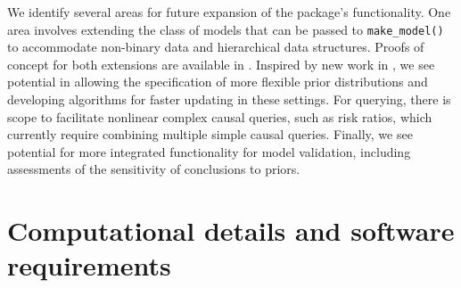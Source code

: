 \documentclass[
  11pt,
  article]{jss}
\begin{document}
We identify several areas for future expansion of the package's
functionality. One area involves extending the class of models that can
be passed to \texttt{make\_model()} to accommodate non-binary data and
hierarchical data structures. Proofs of concept for both extensions are
available in \citet{humphreys_integrated_2023}. Inspired by new work in
\citet{irons2023causally}, we see potential in allowing the
specification of more flexible prior distributions and developing
algorithms for faster updating in these settings. For querying, there is
scope to facilitate nonlinear complex causal queries, such as risk
ratios, which currently require combining multiple simple causal
queries. Finally, we see potential for more integrated functionality for
model validation, including assessments of the sensitivity of
conclusions to priors.

\FloatBarrier

\newpage{}

\section*{Computational details and software
requirements}\label{computational-details-and-software-requirements}
\end{document}
